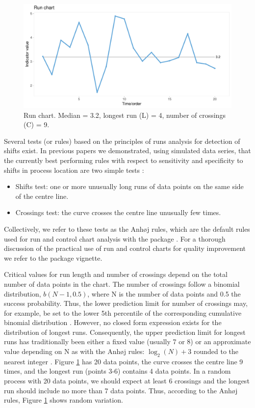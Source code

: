 \begin{figure}[htbp]
  \centering
  \includegraphics[width=\textwidth]{fig_run.pdf}
  \caption{Run chart. Median = 3.2, longest run (L) = 4, number of crossings (C) = 9.}
  \label{figure:run}
\end{figure}

Several tests (or rules) based on the principles of runs analysis for
detection of shifts exist. In previous papers we demonstrated, using
simulated data series, that the currently best performing rules with
respect to sensitivity and specificity to shifts in process location are
two simple tests \citep{anhoej2014, anhoej2015, anhoej2018}:

\begin{itemize}
\item
  Shifts test: one or more unusually long runs of data points on the
  same side of the centre line.
\item
  Crossings test: the curve crosses the centre line unusually few times.
\end{itemize}

Collectively, we refer to these tests as the Anhøj rules, which are the
default rules used for run and control chart analysis with the
 package \citep{qicharts2}. For a thorough discussion
of the practical use of run and control charts for quality improvement
we refer to the  package vignette.

Critical values for run length and number of crossings depend on the
total number of data points in the chart. The number of crossings follow
a binomial distribution, \(b(N - 1, 0.5)\), where N is the number of
data points and 0.5 the success probability. Thus, the lower prediction
limit for number of crossings may, for example, be set to the lower 5th
percentile of the corresponding cumulative binomial distribution
\citep{chen2010}. However, no closed form expression exists for the
distribution of longest runs. Consequently, the upper prediction limit
for longest runs has traditionally been either a fixed value (usually 7
or 8) \citep{carey2002a} or an approximate value depending on N as with
the Anhøj rules: \(\log_2(N) + 3\) rounded to the nearest integer
\citep{schilling2012}. Figure \ref{figure:run} has 20 data points, the
curve crosses the centre line 9 times, and the longest run (points 3-6)
contains 4 data points. In a random process with 20 data points, we
should expect at least 6 crossings and the longest run should include no
more than 7 data points. Thus, according to the Anhøj rules, Figure
\ref{figure:run} shows random variation.


